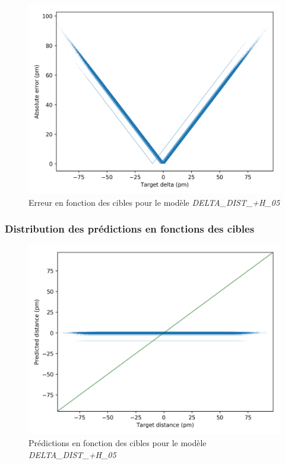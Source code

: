 \begin{figure}
	\centering
	
	\includegraphics[scale=0.7]{../figures/DELTA_DIST_+H_05/DELTA_DIST+H_05_distrib_rmse_dist.png}	
	
	\caption{Erreur en fonction des cibles pour le modèle \emph{DELTA\_DIST\_+H\_05}}
	\label{fig_distrib_err_rel_delta_dist}

	\end{figure}



\subsubsection{Distribution des prédictions en fonctions des cibles}

\begin{figure}
	\centering
	
	\includegraphics[scale=0.7]{../figures/DELTA_DIST_+H_05/DELTA_DIST+H_05_preds_targets.png}	
	
	\caption{Prédictions en fonction des cibles pour le modèle \emph{DELTA\_DIST\_+H\_05}}
	\label{fig_preds_targets_delta_dist}

	
\end{figure}

